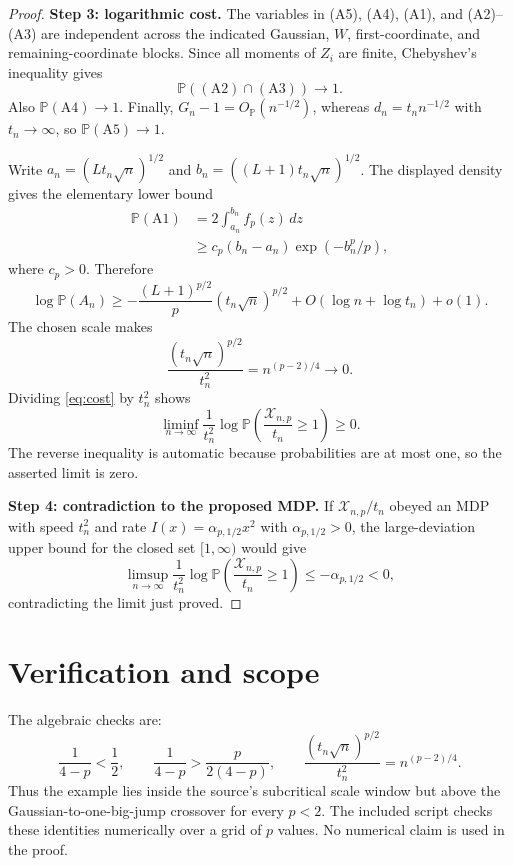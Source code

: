 \documentclass[11pt]{article}
\newcommand{\Pp}{\mathbb P}
\newcommand{\Xscr}{\mathscr X}
\begin{document}
\begin{proof}
\medskip
\noindent\textbf{Step 3: logarithmic cost.}
The variables in (A5), (A4), (A1), and (A2)--(A3) are independent across
the indicated Gaussian, $W$, first-coordinate, and remaining-coordinate
blocks.  Since all moments of $Z_i$ are finite, Chebyshev's inequality gives
\[
 \Pp((\mathrm{A2})\cap(\mathrm{A3}))\longrightarrow1.
\]
Also $\Pp(\mathrm{A4})\to1$.  Finally,
$G_n-1=O_{\Pp}(n^{-1/2})$, whereas $d_n=t_n n^{-1/2}$ with $t_n\to\infty$,
so $\Pp(\mathrm{A5})\to1$.

Write $a_n=(Lt_n\sqrt n)^{1/2}$ and
$b_n=((L+1)t_n\sqrt n)^{1/2}$.  The displayed density gives the elementary
lower bound
\begin{align*}
 \Pp(\mathrm{A1})
 &=2\int_{a_n}^{b_n}f_p(z)\,dz\\
 &\ge c_p(b_n-a_n)\exp(-b_n^p/p),
\end{align*}
where $c_p>0$.  Therefore
\begin{equation}\label{eq:cost}
 \log\Pp(A_n)
 \ge-\frac{(L+1)^{p/2}}p(t_n\sqrt n)^{p/2}
 +O(\log n+\log t_n)+o(1).
\end{equation}
The chosen scale makes
\[
 \frac{(t_n\sqrt n)^{p/2}}{t_n^2}
 =n^{(p-2)/4}\longrightarrow0.
\]
Dividing \eqref{eq:cost} by $t_n^2$ shows
\[
 \liminf_{n\to\infty}\frac1{t_n^2}
 \log\Pp\!\left(\frac{\Xscr_{n,p}}{t_n}\ge1\right)\ge0.
\]
The reverse inequality is automatic because probabilities are at most one,
so the asserted limit is zero.

\medskip
\noindent\textbf{Step 4: contradiction to the proposed MDP.}
If $\Xscr_{n,p}/t_n$ obeyed an MDP with speed $t_n^2$ and rate
$I(x)=\alpha_{p,1/2}x^2$ with $\alpha_{p,1/2}>0$, the large-deviation upper
bound for the closed set $[1,\infty)$ would give
\[
 \limsup_{n\to\infty}\frac1{t_n^2}
 \log\Pp\!\left(\frac{\Xscr_{n,p}}{t_n}\ge1\right)
 \le-\alpha_{p,1/2}<0,
\]
contradicting the limit just proved.
\end{proof}

\section{Verification and scope}

The algebraic checks are:
\[
 \frac1{4-p}<\frac12,
 \qquad
 \frac1{4-p}>\frac{p}{2(4-p)},
 \qquad
 \frac{(t_n\sqrt n)^{p/2}}{t_n^2}=n^{(p-2)/4}.
\]
Thus the example lies inside the source's subcritical scale window but above
the Gaussian-to-one-big-jump crossover for every $p<2$.  The included script
checks these identities numerically over a grid of $p$ values.  No numerical
claim is used in the proof.
\end{document}
